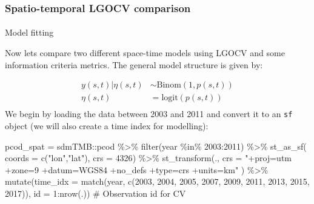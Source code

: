 \documentclass[
  letterpaper,
  DIV=11,
  numbers=noendperiod]{scrartcl}
\makeatletter
\let\oldparagraph\paragraph
\renewcommand{\paragraph}{
    \@ifstar
      \xxxParagraphStar
      \xxxParagraphNoStar
  }
\newcommand{\xxxParagraphStar}[1]{\oldparagraph*{#1}\mbox{}}
\newcommand{\xxxParagraphNoStar}[1]{\oldparagraph{#1}\mbox{}}
\newenvironment{Shaded}{\begin{snugshade}}{\end{snugshade}}
\newcommand{\AttributeTok}[1]{\textcolor[rgb]{0.40,0.45,0.13}{#1}}
\newcommand{\CommentTok}[1]{\textcolor[rgb]{0.37,0.37,0.37}{#1}}
\newcommand{\DecValTok}[1]{\textcolor[rgb]{0.68,0.00,0.00}{#1}}
\newcommand{\FunctionTok}[1]{\textcolor[rgb]{0.28,0.35,0.67}{#1}}
\newcommand{\NormalTok}[1]{\textcolor[rgb]{0.00,0.23,0.31}{#1}}
\newcommand{\OtherTok}[1]{\textcolor[rgb]{0.00,0.23,0.31}{#1}}
\newcommand{\SpecialCharTok}[1]{\textcolor[rgb]{0.37,0.37,0.37}{#1}}
\newcommand{\StringTok}[1]{\textcolor[rgb]{0.13,0.47,0.30}{#1}}
\makeatother
\begin{document}
\subsubsection{Spatio-temporal LGOCV
comparison}\label{spatio-temporal-lgocv-comparison}

\paragraph{Model fitting}\label{model-fitting}

Now lets compare two different space-time models using LGOCV and some
information criteria metrics. The general model structure is given by:

\[
\begin{aligned}
y(s,t)|\eta(s,t)&\sim\text{Binom}(1, p(s,t))\\
\eta(s,t) &= \text{logit}(p(s,t)) \\
\end{aligned}
\] We begin by loading the data between 2003 and 2011 and convert it to
an \texttt{sf} object (we will also create a time index for modelling):

\begin{Shaded}
\begin{Highlighting}[]
\NormalTok{pcod\_spat }\OtherTok{=}\NormalTok{ sdmTMB}\SpecialCharTok{::}\NormalTok{pcod }\SpecialCharTok{\%\textgreater{}\%}
  \FunctionTok{filter}\NormalTok{(year }\SpecialCharTok{\%in\%} \DecValTok{2003}\SpecialCharTok{:}\DecValTok{2011}\NormalTok{) }\SpecialCharTok{\%\textgreater{}\%}
  \FunctionTok{st\_as\_sf}\NormalTok{( }\AttributeTok{coords =} \FunctionTok{c}\NormalTok{(}\StringTok{"lon"}\NormalTok{,}\StringTok{"lat"}\NormalTok{), }\AttributeTok{crs =} \DecValTok{4326}\NormalTok{) }\SpecialCharTok{\%\textgreater{}\%}
  \FunctionTok{st\_transform}\NormalTok{(., }\AttributeTok{crs =} \StringTok{"+proj=utm +zone=9 +datum=WGS84 +no\_defs +type=crs +units=km"}\NormalTok{ ) }\SpecialCharTok{\%\textgreater{}\%}
   \FunctionTok{mutate}\NormalTok{(}\AttributeTok{time\_idx =} \FunctionTok{match}\NormalTok{(year, }\FunctionTok{c}\NormalTok{(}\DecValTok{2003}\NormalTok{, }\DecValTok{2004}\NormalTok{, }\DecValTok{2005}\NormalTok{, }\DecValTok{2007}\NormalTok{, }\DecValTok{2009}\NormalTok{, }\DecValTok{2011}\NormalTok{, }\DecValTok{2013}\NormalTok{, }\DecValTok{2015}\NormalTok{, }\DecValTok{2017}\NormalTok{)),}
         \AttributeTok{id =} \DecValTok{1}\SpecialCharTok{:}\FunctionTok{nrow}\NormalTok{(.)) }\CommentTok{\# Observation id for CV}
\end{Highlighting}
\end{Shaded}
\end{document}
